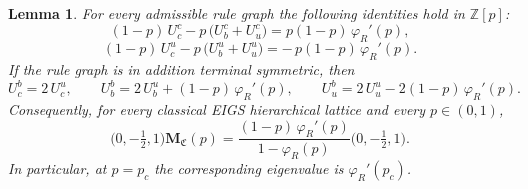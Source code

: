 \documentclass[scheme=plain,11pt]{ctexart}
\newtheorem{lemma}[theorem]{Lemma}
\theoremstyle{definition}
\theoremstyle{remark}
\begin{document}
\begin{lemma}\label{lem:exact-row-identities}\label{lem:conditional-pivotal-counts}\label{prop:universal-eigenvectors}
For every admissible rule graph the following identities hold in $\mathbb Z[p]$:
\[
   (1-p)\,U^{c}_{c}-p\,\bigl(U^{c}_{b}+U^{c}_{u}\bigr)=p(1-p)\,\varphi_R'(p),
\]
\[
   (1-p)\,U^{u}_{c}-p\,\bigl(U^{u}_{b}+U^{u}_{u}\bigr)=-\,p(1-p)\,\varphi_R'(p).
\]
If the rule graph is in addition terminal symmetric, then
\[
   U^{b}_{c}=2\,U^{u}_{c},
   \qquad
   U^{b}_{b}=2\,U^{u}_{b}+(1-p)\,\varphi_R'(p),
   \qquad
   U^{b}_{u}=2\,U^{u}_{u}-2(1-p)\,\varphi_R'(p).
\]
Consequently, for every classical EIGS hierarchical lattice and every $p\in(0,1)$,
\[
 \bigl(0,-\tfrac12,1\bigr)\mathbf M_{\mathfrak C}(p)
 =\frac{(1-p)\,\varphi_R'(p)}{1-\varphi_R(p)}
 \bigl(0,-\tfrac12,1\bigr).
\]
In particular, at $p=p_c$ the corresponding eigenvalue is $\varphi_R'(p_c)$.
\end{lemma}
\end{document}
